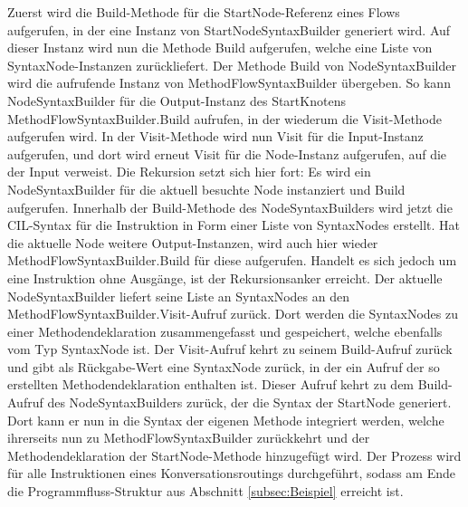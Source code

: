 Zuerst wird die Build-Methode für die StartNode-Referenz eines Flows aufgerufen, in der eine Instanz von StartNodeSyntaxBuilder generiert wird. Auf dieser Instanz wird nun die Methode Build aufgerufen, welche eine Liste von SyntaxNode-Instanzen zurückliefert. Der Methode Build von NodeSyntaxBuilder wird die aufrufende Instanz von MethodFlowSyntaxBuilder übergeben. So kann NodeSyntaxBuilder für die Output-Instanz des StartKnotens MethodFlowSyntaxBuilder.Build aufrufen, in der wiederum die Visit-Methode aufgerufen wird. In der Visit-Methode wird nun Visit für die Input-Instanz aufgerufen, und dort wird erneut Visit für die Node-Instanz aufgerufen, auf die der Input verweist. Die Rekursion setzt sich hier fort: Es wird ein NodeSyntaxBuilder für die aktuell besuchte Node instanziert und Build aufgerufen. Innerhalb der Build-Methode des NodeSyntaxBuilders wird jetzt die CIL-Syntax für die Instruktion in Form einer Liste von SyntaxNodes erstellt. Hat die aktuelle Node weitere Output-Instanzen, wird auch hier wieder MethodFlowSyntaxBuilder.Build für diese aufgerufen. Handelt es sich jedoch um eine Instruktion ohne Ausgänge, ist der Rekursionsanker erreicht. Der aktuelle NodeSyntaxBuilder liefert seine Liste an SyntaxNodes an den MethodFlowSyntaxBuilder.Visit-Aufruf zurück. Dort werden die SyntaxNodes zu einer Methodendeklaration zusammengefasst und gespeichert, welche ebenfalls vom Typ SyntaxNode ist. Der Visit-Aufruf kehrt zu seinem Build-Aufruf zurück und gibt als Rückgabe-Wert eine SyntaxNode zurück, in der ein Aufruf der so erstellten Methodendeklaration enthalten ist. Dieser Aufruf kehrt zu dem Build-Aufruf des NodeSyntaxBuilders zurück, der die Syntax der StartNode generiert. Dort kann er nun in die Syntax der eigenen Methode integriert werden, welche ihrerseits nun zu MethodFlowSyntaxBuilder zurückkehrt und der Methodendeklaration der StartNode-Methode hinzugefügt wird. Der Prozess wird für alle Instruktionen eines Konversationsroutings durchgeführt, sodass am Ende die Programmfluss-Struktur aus Abschnitt \ref{subsec:Beispiel} erreicht ist.

